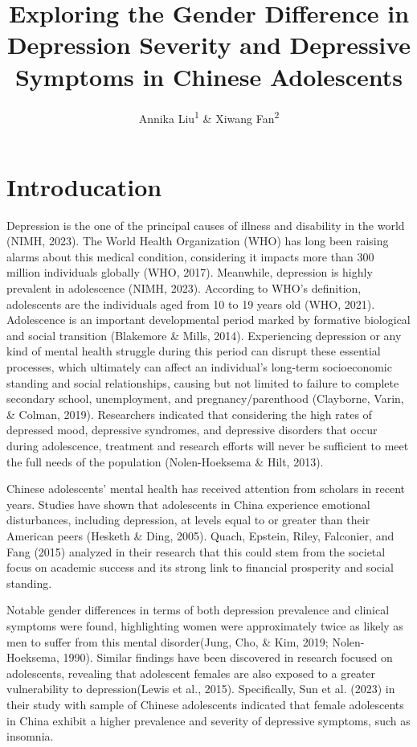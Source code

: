 \documentclass[
  man,floatsintext]{apa6}
\title{Exploring the Gender Difference in Depression Severity and Depressive Symptoms in Chinese Adolescents}
\author{Annika Liu\textsuperscript{1} \& Xiwang Fan\textsuperscript{2}}
\date{}
\affiliation{\phantom{0}}
\begin{document}
\maketitle

\hypertarget{introducation}{%
\section{Introducation}\label{introducation}}

Depression is the one of the principal causes of illness and disability in the world (NIMH, 2023). The World Health Organization (WHO) has long been raising alarms about this medical condition, considering it impacts more than 300 million individuals globally (WHO, 2017). Meanwhile, depression is highly prevalent in adolescence (NIMH, 2023). According to WHO's definition, adolescents are the individuals aged from 10 to 19 years old (WHO, 2021). Adolescence is an important developmental period marked by formative biological and social transition (Blakemore \& Mills, 2014). Experiencing depression or any kind of mental health struggle during this period can disrupt these essential processes, which ultimately can affect an individual's long-term socioeconomic standing and social relationships, causing but not limited to failure to complete secondary school, unemployment, and pregnancy/parenthood (Clayborne, Varin, \& Colman, 2019). Researchers indicated that considering the high rates of depressed mood, depressive syndromes, and depressive disorders that occur during adolescence, treatment and research efforts will never be sufficient to meet the full needs of the population (Nolen-Hoeksema \& Hilt, 2013).

Chinese adolescents' mental health has received attention from scholars in recent years. Studies have shown that adolescents in China experience emotional disturbances, including depression, at levels equal to or greater than their American peers (Hesketh \& Ding, 2005). Quach, Epstein, Riley, Falconier, and Fang (2015) analyzed in their research that this could stem from the societal focus on academic success and its strong link to financial prosperity and social standing.

Notable gender differences in terms of both depression prevalence and clinical symptoms were found, highlighting women were approximately twice as likely as men to suffer from this mental disorder(Jung, Cho, \& Kim, 2019; Nolen-Hoeksema, 1990). Similar findings have been discovered in research focused on adolescents, revealing that adolescent females are also exposed to a greater vulnerability to depression(Lewis et al., 2015). Specifically, Sun et al. (2023) in their study with sample of Chinese adolescents indicated that female adolescents in China exhibit a higher prevalence and severity of depressive symptoms, such as insomnia.
\end{document}
